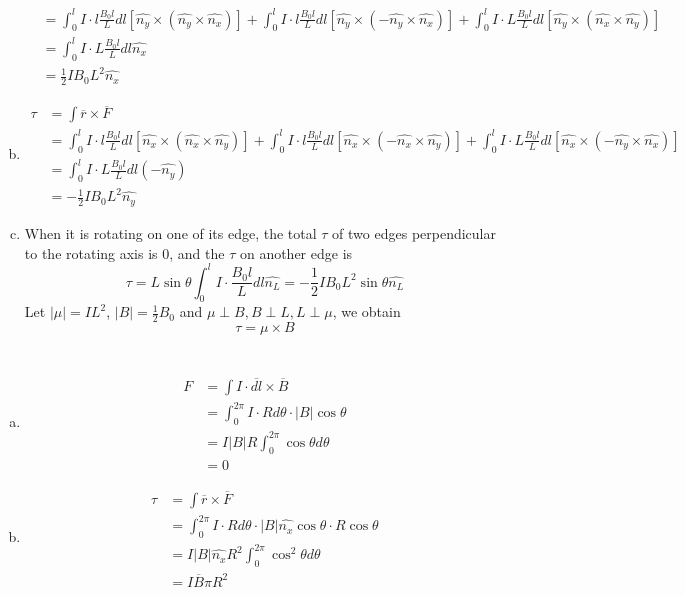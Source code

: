 \documentclass{article}
\begin{document}
\begin{enumerate}[(a)]
\begin{align*}
&=\int_0^l I\cdot l\frac{B_0l}{L}dl[\hat{n_y}\times(\hat{n_y}\times\hat{n_x})]
+\int_0^l I\cdot l\frac{B_0l}{L}dl[\hat{n_y}\times(-\hat{n_y}\times\hat{n_x})]
+\int_0^l I\cdot L\frac{B_0l}{L}dl[\hat{n_y}\times(\hat{n_x}\times\hat{n_y})]\\
&=\int_0^l I\cdot L\frac{B_0l}{L}dl\hat{n_x}\\
&=\frac{1}{2}IB_0L^2\hat{n_x}
\end{align*}
\item
\begin{align*}
\tau&=\int \overline{r}\times\overline{F}\\
&=\int_0^l I\cdot l\frac{B_0l}{L}dl[\hat{n_x}\times(\hat{n_x}\times\hat{n_y})]
+\int_0^l I\cdot l\frac{B_0l}{L}dl[\hat{n_x}\times(-\hat{n_x}\times\hat{n_y})]
+\int_0^l I\cdot L\frac{B_0l}{L}dl[\hat{n_x}\times(-\hat{n_y}\times\hat{n_x})]\\
&=\int_0^l I\cdot L\frac{B_0l}{L}dl(-\hat{n_y})\\
&=-\frac{1}{2}IB_0L^2\hat{n_y}
\end{align*}
\item
When it is rotating on one of its edge, the total $\tau$ of two edges perpendicular to the rotating axis is 0, and the $\tau$ on another edge is
$$\tau=L\sin\theta\int_0^l I\cdot \frac{B_0l}{L}dl\hat{n_L}=-\frac{1}{2}IB_0L^2\sin\theta\hat{n_L}$$
Let $|\mu|=IL^2$, $|B|=\frac{1}{2}B_0$ and $\mu\perp B, B\perp L, L\perp\mu$, we obtain
$$\tau=\mu\times B$$

\end{enumerate}


\section{}
\begin{enumerate}[(a)]
\item
\begin{align*}
F&=\int I\cdot\overline{dl}\times\overline{B}\\
&=\int_0^{2\pi} I\cdot Rd\theta\cdot |B|\cos\theta\\
&=I|B|R\int_0^{2\pi}\cos\theta d\theta\\
&=0
\end{align*}
\item
\begin{align*}
\tau&=\int \overline{r}\times\overline{F}\\
&=\int_0^{2\pi} I\cdot Rd\theta\cdot |B|\hat{n_x}\cos\theta \cdot R\cos\theta\\
&=I|B|\hat{n_x}R^2\int_0^{2\pi}\cos^2\theta d\theta\\
&=I\overline{B}\pi R^2
\end{align*}

\end{enumerate}
\end{document}
